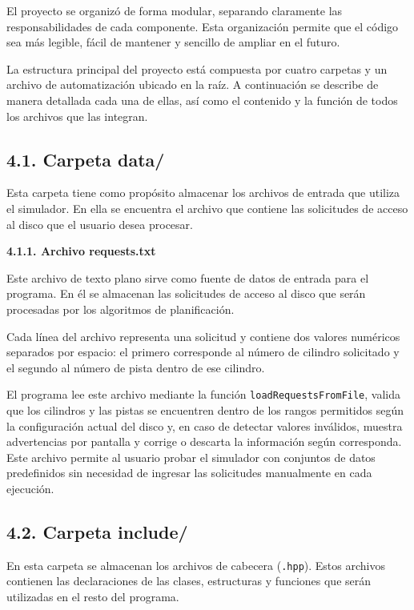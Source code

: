 \documentclass[14pt,letterpaper]{extarticle}
\begin{document}
El proyecto se organizó de forma modular, separando claramente las responsabilidades de cada componente. Esta organización permite que el código sea más legible, fácil de mantener y sencillo de ampliar en el futuro.

La estructura principal del proyecto está compuesta por cuatro carpetas y un archivo de automatización ubicado en la raíz. A continuación se describe de manera detallada cada una de ellas, así como el contenido y la función de todos los archivos que las integran.

\subsection*{4.1. Carpeta data/}

Esta carpeta tiene como propósito almacenar los archivos de entrada que utiliza el simulador. En ella se encuentra el archivo que contiene las solicitudes de acceso al disco que el usuario desea procesar.

\textbf{4.1.1. Archivo requests.txt}

Este archivo de texto plano sirve como fuente de datos de entrada para el programa. En él se almacenan las solicitudes de acceso al disco que serán procesadas por los algoritmos de planificación.

Cada línea del archivo representa una solicitud y contiene dos valores numéricos separados por espacio: el primero corresponde al número de cilindro solicitado y el segundo al número de pista dentro de ese cilindro.

El programa lee este archivo mediante la función \texttt{loadRequestsFromFile}, valida que los cilindros y las pistas se encuentren dentro de los rangos permitidos según la configuración actual del disco y, en caso de detectar valores inválidos, muestra advertencias por pantalla y corrige o descarta la información según corresponda. Este archivo permite al usuario probar el simulador con conjuntos de datos predefinidos sin necesidad de ingresar las solicitudes manualmente en cada ejecución.

\subsection*{4.2. Carpeta include/}

En esta carpeta se almacenan los archivos de cabecera (\texttt{.hpp}). Estos archivos contienen las declaraciones de las clases, estructuras y funciones que serán utilizadas en el resto del programa.
\end{document}
